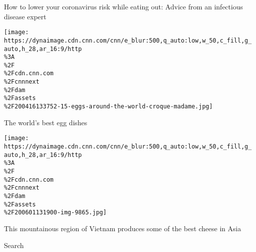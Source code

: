 \href{/travel/article/coronavirus-safety-restaurants-wellness/index.html}{}

How to lower your coronavirus risk while eating out: Advice from an
infectious disease expert

\href{/travel/article/best-egg-dishes-world/index.html}{}

\texttt{[image: https://dynaimage.cdn.cnn.com/cnn/e\_blur:500,q\_auto:low,w\_50,c\_fill,g\_auto,h\_28,ar\_16:9/http\\\%3A\\\%2F\\\%2Fcdn.cnn.com\\\%2Fcnnnext\\\%2Fdam\\\%2Fassets\\\%2F200416133752-15-eggs-around-the-world-croque-madame.jpg]}

\href{/travel/article/best-egg-dishes-world/index.html}{}

The world's best egg dishes

\href{/travel/article/vietnam-cheese-dalat/index.html}{}

\texttt{[image: https://dynaimage.cdn.cnn.com/cnn/e\_blur:500,q\_auto:low,w\_50,c\_fill,g\_auto,h\_28,ar\_16:9/http\\\%3A\\\%2F\\\%2Fcdn.cnn.com\\\%2Fcnnnext\\\%2Fdam\\\%2Fassets\\\%2F200601131900-img-9865.jpg]}

\href{/travel/article/vietnam-cheese-dalat/index.html}{}

This mountainous region of Vietnam produces some of the best cheese in
Asia

Search

